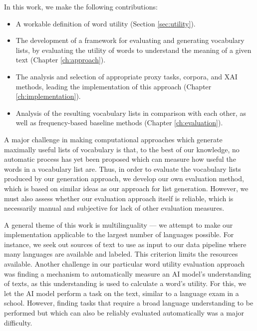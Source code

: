 In this work, we make the following contributions:

\begin{itemize}
	\item A workable definition of word utility (Section \ref{sec:utility}).
	\item The development of a framework for evaluating and generating vocabulary lists, by evaluating the utility of words to understand the meaning of a given text (Chapter \ref{ch:approach}).
	\item The analysis and selection of appropriate proxy tasks, corpora, and XAI methods, leading the implementation of this approach (Chapter \ref{ch:implementation}).
	\item Analysis of the resulting vocabulary lists in comparison with each other, as well as frequency-based baseline methods (Chapter \ref{ch:evaluation}).
\end{itemize}

A major challenge in making computational approaches which generate maximally useful lists of vocabulary is that, to the best of our knowledge, no automatic process has yet been proposed which can measure how useful the words in a vocabulary list are. 
Thus, in order to evaluate the vocabulary lists produced by our generation approach, we develop our own evaluation method, which is based on similar ideas as our approach for list generation.
However, we must also assess whether our evaluation approach itself is reliable, which is necessarily manual and subjective for lack of other evaluation measures.

A general theme of this work is multilinguality --- we attempt to make our implementation applicable to the largest number of languages possible.
For instance, we seek out sources of text to use as input to our data pipeline where many languages are available and labeled.
This criterion limits the resources available.
Another challenge in our particular word utility evaluation approach was finding a mechanism to automatically measure an AI model's understanding of texts, as this understanding is used to calculate a word's utility.
For this, we let the AI model perform a task on the text, similar to a language exam in a school.
However, finding tasks that require a broad language understanding to be performed but which can also be reliably evaluated automatically was a major difficulty.


